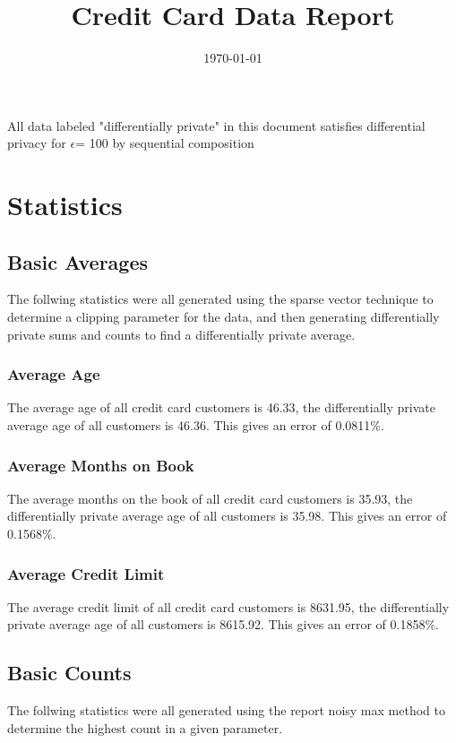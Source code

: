 \documentclass{article}%
\title{Credit Card Data Report}%
\date{\today}%
\begin{document}
%
\normalsize%
\maketitle%
All data labeled "differentially private" in this document satisfies differential privacy for %
$\epsilon$=%
100 by sequential composition%
\section{Statistics}%
\label{sec:Statistics}%
\subsection{Basic Averages}%
\label{subsec:BasicAverages}%
The follwing statistics were all generated using the sparse vector technique to determine a clipping parameter for the data, and then generating differentially private sums and counts to find a differentially private average.%
\subsubsection{Average Age}%
\label{ssubsec:AverageAge}%
The average age of all credit card customers is 46.33, the differentially private average age of all customers is 46.36. This gives an error of 0.0811\%.

%
\subsubsection{Average Months on Book}%
\label{ssubsec:AverageMonthsonBook}%
The average months on the book of all credit card customers is 35.93, the differentially private average age of all customers is 35.98. This gives an error of 0.1568\%.

%
\subsubsection{Average Credit Limit}%
\label{ssubsec:AverageCreditLimit}%
The average credit limit of all credit card customers is 8631.95, the differentially private average age of all customers is 8615.92. This gives an error of 0.1858\%.

%
\subsection{Basic Counts}%
\label{subsec:BasicCounts}%
The follwing statistics were all generated using the report noisy max method to determine the highest count in a given parameter.%
\end{document}

